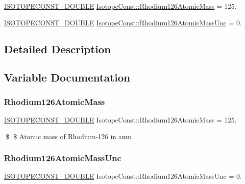 \begin{DoxyCompactItemize}
\item 
\mbox{\hyperlink{group___isotope_const-_macros_ga8f45a7272ce02c0b4c65c44636ed719a}{I\+S\+O\+T\+O\+P\+E\+C\+O\+N\+S\+T\+\_\+\+D\+O\+U\+B\+LE}} \mbox{\hyperlink{group___isotope_const-_rhodium-_rh126_ga5261655e89dd1d92c010bac823c3e8de}{Isotope\+Const\+::\+Rhodium126\+Atomic\+Mass}} = 125.
\item 
\mbox{\hyperlink{group___isotope_const-_macros_ga8f45a7272ce02c0b4c65c44636ed719a}{I\+S\+O\+T\+O\+P\+E\+C\+O\+N\+S\+T\+\_\+\+D\+O\+U\+B\+LE}} \mbox{\hyperlink{group___isotope_const-_rhodium-_rh126_ga84d78ff8bc2d350ee35ca7b98a2b9b50}{Isotope\+Const\+::\+Rhodium126\+Atomic\+Mass\+Unc}} = 0.
\end{DoxyCompactItemize}


\subsection{Detailed Description}


\subsection{Variable Documentation}
\mbox{\label{group___isotope_const-_rhodium-_rh126_ga5261655e89dd1d92c010bac823c3e8de}} 
\subsubsection{\texorpdfstring{Rhodium126\+Atomic\+Mass}{Rhodium126AtomicMass}}
{\footnotesize\ttfamily \mbox{\hyperlink{group___isotope_const-_macros_ga8f45a7272ce02c0b4c65c44636ed719a}{I\+S\+O\+T\+O\+P\+E\+C\+O\+N\+S\+T\+\_\+\+D\+O\+U\+B\+LE}} Isotope\+Const\+::\+Rhodium126\+Atomic\+Mass = 125.}

\$ \$ Atomic mass of Rhodium-\/126 in amu. \mbox{\label{group___isotope_const-_rhodium-_rh126_ga84d78ff8bc2d350ee35ca7b98a2b9b50}} 
\subsubsection{\texorpdfstring{Rhodium126\+Atomic\+Mass\+Unc}{Rhodium126AtomicMassUnc}}
{\footnotesize\ttfamily \mbox{\hyperlink{group___isotope_const-_macros_ga8f45a7272ce02c0b4c65c44636ed719a}{I\+S\+O\+T\+O\+P\+E\+C\+O\+N\+S\+T\+\_\+\+D\+O\+U\+B\+LE}} Isotope\+Const\+::\+Rhodium126\+Atomic\+Mass\+Unc = 0.}

